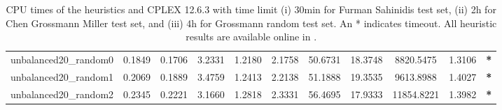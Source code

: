\begin{table}
\begin{adjustbox}{center}
\begin{tabular}{|ccccccccccc|}
unbalanced20\_random0 & 0.1849 & 0.1706 & 3.2331 & 1.2180 & 2.1758 & 50.6731 & 18.3748 & 8820.5475 & 1.3106 & \textbf{*} \\ 
unbalanced20\_random1 & 0.2069 & 0.1889 & 3.4759 & 1.2413 & 2.2138 & 51.1888 & 19.3535 & 9613.8988 & 1.4027 & \textbf{*} \\ 
unbalanced20\_random2 & 0.2345 & 0.2221 & 3.1660 & 1.2818 & 2.3331 & 56.4695 & 17.9333 & 11854.8221 & 1.3982 & \textbf{*} \\ 
\hline 
\end{tabular} 
\end{adjustbox} 
\vspace*{-0.2cm} 
\caption{CPU times of the heuristics and CPLEX 12.6.3 with time limit (i) 30min for Furman Sahinidis test set, (ii) 2h for Chen Grossmann Miller test set, and (iii) 4h for Grossmann random test set. An * indicates timeout. All heuristic results are available online in \cite{source_code}.} 
\label{Table:Heuristic_CPU_Times} 
\end{table} 
